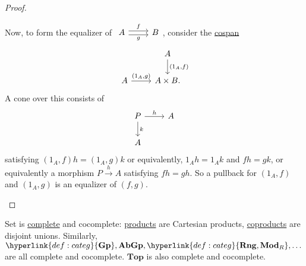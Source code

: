 \documentclass{article}
\newcommand{\named}[1]{\textbf{#1}\index{#1}}
\let\to\longrightarrow
\begin{document}
\begin{proof}
\begin{enumerate}[label=(\roman*)]
    Now, to form the equalizer of $\begin{tikzcd}A \rar[shift left]{f} \rar[shift right,']{g} & B\end{tikzcd}$, consider the \hyperlink{def:span}{cospan}
    \begin{equation*}
      \begin{tikzcd}
        &A \dar{(1_A,f)} \\
        A \rar{(1_A, g)} & A \times B.
      \end{tikzcd}
    \end{equation*}
    A cone over this consists of
    \begin{equation*}
      \begin{tikzcd}
      P \rar{h} \dar{k} & A \\ A
      \end{tikzcd}
    \end{equation*}
    satisfying $(1_A, f) h = (1_A, g) k$ or equivalently, $1_A h = 1_A k$ and $fh = gk$, or equivalently a morphism $P \overset{h}\to A$ satisfying $fh = gh$.
    So a pullback for $(1_A,f)$ and $(1_A, g)$ is an equalizer of $(f,g)$. \qedhere
   \end{enumerate}
\end{proof}
Set is \hyperlink{def:complete}{complete} and cocomplete: \hyperlink{def:lprod}{products} are Cartesian products, \hyperlink{def:lcoprod}{coproducts} are disjoint unions.
Similarly, $\hyperlink{def:categ}{\mathbf{Gp}}, \mathbf{AbGp}, \hyperlink{def:categ}{\mathbf{Rng}, \mathbf{Mod}_R}, \dotsc$ are all complete and cocomplete.
$\mathbf{Top}$ is also complete and cocomplete.
\end{document}
